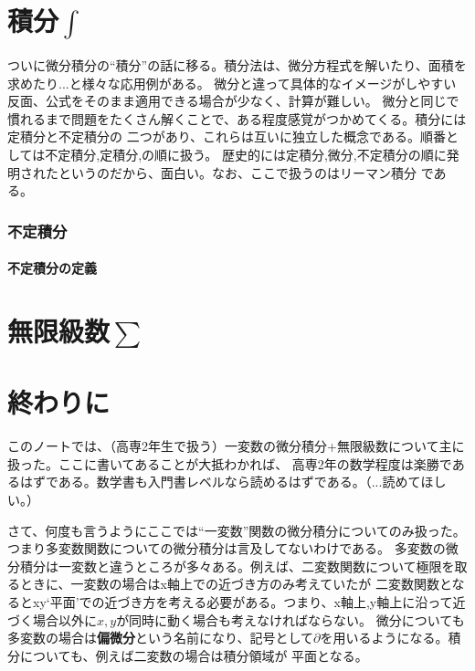 \documentclass[a4j,dvipdfmx]{jsarticle}
\newcommand{\linktoMOKUZI}{\vspace{\stretch{1}}\fbox{\centerline{\hyperref[目次]{目次に戻る}}}}
\begin{document}
            \linktoMOKUZI
    \clearpage

    \part{積分$\int$}
        \begin{screen}
            ついに微分積分の``積分''の話に移る。積分法は、微分方程式を解いたり、面積を求めたり...と様々な応用例がある。
            微分と違って具体的なイメージがしやすい反面、公式をそのまま適用できる場合が少なく、計算が難しい。
            微分と同じで慣れるまで問題をたくさん解くことで、ある程度感覚がつかめてくる。積分には定積分と不定積分の
            二つがあり、これらは互いに独立した概念である。順番としては不定積分,定積分,の順に扱う。
            歴史的には定積分,微分,不定積分の順に発明されたというのだから、面白い。なお、ここで扱うのはリーマン積分
            である。
        \end{screen}
        \clearpage
        \section{不定積分}
            \subsection{不定積分の定義}
    \clearpage
    \part{無限級数$\sum$}
    \clearpage
    \part{終わりに}
        このノートでは、（高専2年生で扱う）一変数の微分積分+無限級数について主に扱った。ここに書いてあることが大抵わかれば、
        高専2年の数学程度は楽勝であるはずである。数学書も入門書レベルなら読めるはずである。（...読めてほしい。）
        
        さて、何度も言うようにここでは``一変数''関数の微分積分についてのみ扱った。つまり多変数関数についての微分積分は言及してないわけである。
        多変数の微分積分は一変数と違うところが多々ある。例えば、二変数関数について極限を取るときに、一変数の場合はx軸上での近づき方のみ考えていたが
        二変数関数となるとxy`平面'での近づき方を考える必要がある。つまり、x軸上,y軸上に沿って近づく場合以外に$x,y$が同時に動く場合も考えなければならない。
        微分についても多変数の場合は\textbf{偏微分}という名前になり、記号として$\partial$を用いるようになる。積分についても、例えば二変数の場合は積分領域が
        平面となる。
\end{document}
